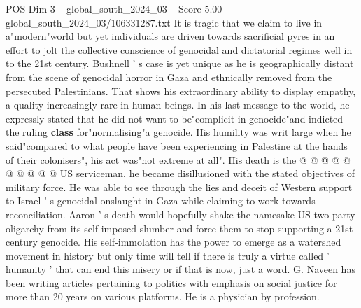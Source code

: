 \begin{textsample}{POS Dim 3 – global\_south\_2024\_03 – Score 5.00 – global\_south\_2024\_03/106331287.txt}
It is tragic that we claim to live in a"modern"world but yet individuals are driven towards sacrificial pyres in an effort to jolt the collective conscience of genocidal and dictatorial regimes well in to the 21st century.
Bushnell ' s case is yet unique as he is geographically distant from the scene of genocidal horror in Gaza and ethnically removed from the persecuted Palestinians.
That shows his extraordinary ability to display empathy, a quality increasingly rare in human beings.
In his last message to the world, he expressly stated that he did not want to be"complicit in genocide"and indicted the ruling \textbf{class} for"normalising"a genocide.
His humility was writ large when he said"compared to what people have been experiencing in Palestine at the hands of their colonisers", his act was"not extreme at all".
His death is the @ @ @ @ @ @ @ @ @ @ US serviceman, he became disillusioned with the stated objectives of military force.
He was able to see through the lies and deceit of Western support to Israel ' s genocidal onslaught in Gaza while claiming to work towards reconciliation.
Aaron ' s death would hopefully shake the namesake US two-party oligarchy from its self-imposed slumber and force them to stop supporting a 21st century genocide.
His self-immolation has the power to emerge as a watershed movement in history but only time will tell if there is truly a virtue called ' humanity ' that can end this misery or if that is now, just a word.
G.
Naveen has been writing articles pertaining to politics with emphasis on social justice for more than 20 years on various platforms.
He is a physician by profession.

\end{textsample}
